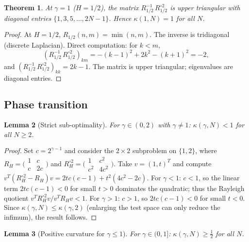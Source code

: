 \documentclass[11pt,a4paper]{article}
\theoremstyle{plain}
\newtheorem{theorem}{Theorem}[section]
\newtheorem{lemma}[theorem]{Lemma}
\theoremstyle{definition}
\theoremstyle{remark}
\begin{document}
\begin{theorem}\label{thm:cauchy}
At $\gamma = 1$ ($H = 1/2$), the matrix $R_{1/2}^{-1}\,R_{1/2}^{\circ 2}$
is upper triangular with diagonal entries $\{1, 3, 5, \ldots, 2N-1\}$.
Hence $\kappa(1,N) = 1$ for all $N$.
\end{theorem}

\begin{proof}
At $H=1/2$, $R_{1/2}(n,m) = \min(n,m)$. The inverse is tridiagonal
(discrete Laplacian). Direct computation: for $k < m$,
\[
  (R_{1/2}^{-1}\,R_{1/2}^{\circ 2})_{km}
  = -(k-1)^2 + 2k^2 - (k+1)^2 = -2,
\]
and $(R_{1/2}^{-1}\,R_{1/2}^{\circ 2})_{kk} = 2k-1$.
The matrix is upper triangular; eigenvalues are diagonal entries.
\end{proof}


\subsection{Phase transition}

\begin{lemma}[Strict sub-optimality]\label{lem:strict-subopt}
For $\gamma \in (0,2)$ with $\gamma \neq 1$:
$\kappa(\gamma,N) < 1$ for all $N \geq 2$.
\end{lemma}

\begin{proof}
Set $c = 2^{\gamma - 1}$ and consider the $2 \times 2$ subproblem
on $\{1,2\}$, where $R_H = \bigl(\begin{smallmatrix}
1 & c \\ c & 2c \end{smallmatrix}\bigr)$ and
$R_H^{\circ 2} = \bigl(\begin{smallmatrix}
1 & c^2 \\ c^2 & 4c^2 \end{smallmatrix}\bigr)$.
Take $v = (1,t)^T$ and compute
$v^T(R_H^{\circ 2} - R_H)v = 2tc(c-1) + t^2(4c^2 - 2c)$.
For $\gamma < 1$: $c < 1$, so the linear term $2tc(c-1) < 0$ for
small $t > 0$ dominates the quadratic; thus the Rayleigh quotient
$v^T R_H^{\circ 2} v / v^T R_H v < 1$.
For $\gamma > 1$: $c > 1$, so $2tc(c-1) < 0$ for small $t < 0$.
Since $\kappa(\gamma,N) \leq \kappa(\gamma,2)$
(enlarging the test space can only reduce the infimum), the result follows.
\end{proof}

\begin{lemma}[Positive curvature for $\gamma \leq 1$]\label{lem:kappa-lower}
For $\gamma \in (0,1]$: $\kappa(\gamma,N) \geq \frac{1}{2}$ for all $N$.
\end{lemma}
\end{document}
